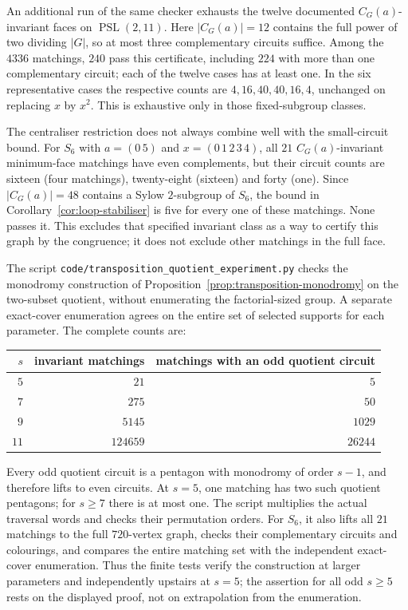 \documentclass[11pt,a4paper]{article}
\theoremstyle{definition}
\theoremstyle{remark}
\newcommand{\PSL}{\operatorname{PSL}}
\begin{document}
An additional run of the same checker exhausts the twelve documented $C_G(a)$-invariant faces on $\PSL(2,11)$.  Here $|C_G(a)|=12$ contains the full power of two dividing $|G|$, so at most three complementary circuits suffice.  Among the $4336$ matchings, $240$ pass this certificate, including $224$ with more than one complementary circuit; each of the twelve cases has at least one.  In the six representative cases the respective counts are $4,16,40,40,16,4$, unchanged on replacing $x$ by $x^2$.  This is exhaustive only in those fixed-subgroup classes.

The centraliser restriction does not always combine well with the small-circuit bound.  For $S_6$ with $a=(0\,5)$ and $x=(0\,1\,2\,3\,4)$, all $21$ $C_G(a)$-invariant minimum-face matchings have even complements, but their circuit counts are sixteen (four matchings), twenty-eight (sixteen) and forty (one).  Since $|C_G(a)|=48$ contains a Sylow $2$-subgroup of $S_6$, the bound in Corollary~\ref{cor:loop-stabiliser} is five for every one of these matchings.  None passes it.  This excludes that specified invariant class as a way to certify this graph by the congruence; it does not exclude other matchings in the full face.

The script \nolinkurl{code/transposition_quotient_experiment.py} checks the monodromy construction of Proposition~\ref{prop:transposition-monodromy} on the two-subset quotient, without enumerating the factorial-sized group.  A separate exact-cover enumeration agrees on the entire set of selected supports for each parameter.  The complete counts are:
\begin{center}
\begin{tabular}{@{}rrr@{}}
\toprule
$s$ & invariant matchings & matchings with an odd quotient circuit\\
\midrule
$5$ & $21$ & $5$\\
$7$ & $275$ & $50$\\
$9$ & $5145$ & $1029$\\
$11$ & $124659$ & $26244$\\
\bottomrule
\end{tabular}
\end{center}
Every odd quotient circuit is a pentagon with monodromy of order $s-1$, and therefore lifts to even circuits.  At $s=5$, one matching has two such quotient pentagons; for $s\ge7$ there is at most one.  The script multiplies the actual traversal words and checks their permutation orders.  For $S_6$, it also lifts all $21$ matchings to the full $720$-vertex graph, checks their complementary circuits and colourings, and compares the entire matching set with the independent exact-cover enumeration.  Thus the finite tests verify the construction at larger parameters and independently upstairs at $s=5$; the assertion for all odd $s\ge5$ rests on the displayed proof, not on extrapolation from the enumeration.
\end{document}
